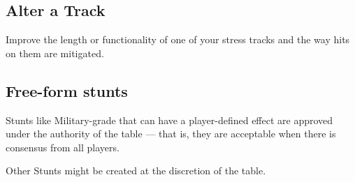 \subsection{Alter a Track}
Improve the length or functionality of one of your stress tracks and the way hits on them are mitigated.

\subsection{Free-form stunts}
Stunts like Military-grade that can have a player-defined effect are approved under the authority of the table --- that is, they are acceptable when there is consensus from all players.

Other Stunts might be created at the discretion of the table.


